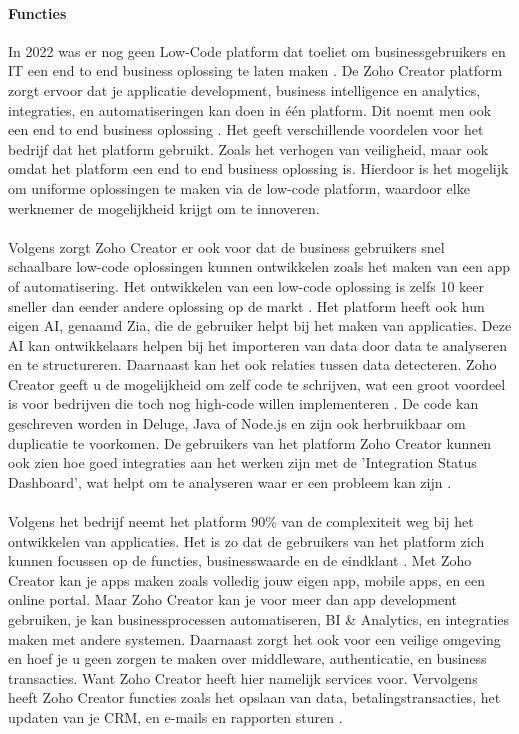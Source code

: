 \paragraph{Functies}
In 2022 was er nog geen Low-Code platform dat toeliet om businessgebruikers en IT een end to end business oplossing te laten maken \autocite{Computer2022}.
De Zoho Creator platform zorgt ervoor dat je applicatie development, business intelligence en analytics, integraties, en automatiseringen kan doen in één platform. Dit noemt men ook een end to end business oplossing \autocite{Computer2022}.
Het geeft verschillende voordelen voor het bedrijf dat het platform gebruikt. Zoals het verhogen van veiligheid, maar ook omdat het platform een end to end business oplossing is. Hierdoor is het mogelijk om uniforme oplossingen te maken via de low-code platform,
waardoor elke werknemer de mogelijkheid krijgt om te innoveren.\\\\ Volgens \textcite{Computer2022} zorgt Zoho Creator er ook voor dat de business gebruikers snel schaalbare low-code oplossingen kunnen ontwikkelen zoals het maken van een app of automatisering.
Het ontwikkelen van een low-code oplossing is zelfs 10 keer sneller dan eender andere oplossing op de markt \autocite{Computer2022}. Het platform heeft ook hun eigen AI, genaamd Zia, die de gebruiker helpt bij het maken van applicaties. Deze AI
kan ontwikkelaars helpen bij het importeren van data door data te analyseren en te structureren. Daarnaast kan het ook relaties tussen data detecteren. 
Zoho Creator geeft u de mogelijkheid om zelf code te schrijven, wat een groot voordeel is voor bedrijven die toch nog high-code willen implementeren \autocite{Computer2022}. 
De code kan geschreven worden in Deluge, Java of Node.js en zijn ook herbruikbaar om duplicatie te voorkomen.
De gebruikers van het platform Zoho Creator kunnen ook zien hoe goed integraties aan het werken zijn met de 'Integration Status Dashboard', wat helpt om te analyseren waar er een probleem kan zijn \autocite{Computer2022}.
\\ 
\\
Volgens het bedrijf \textcite{ZohoCorporation2024b} neemt het platform 90\% van de complexiteit weg bij het ontwikkelen van applicaties. Het is zo dat de gebruikers van het platform
zich kunnen focussen op de functies, businesswaarde en de eindklant \autocite{ZohoCorporation2024b}.  Met Zoho Creator kan je apps maken zoals volledig jouw eigen app, mobile apps, en een online portal.
Maar Zoho Creator kan je voor meer dan app development gebruiken, je kan businessprocessen automatiseren, BI \& Analytics, en integraties maken met andere systemen. Daarnaast zorgt het ook voor een veilige omgeving en hoef je u geen zorgen 
te maken over middleware, authenticatie, en business transacties. Want Zoho Creator heeft hier namelijk services voor. Vervolgens heeft Zoho Creator functies zoals het opslaan van data,
betalingstransacties, het updaten van je CRM, en e-mails en rapporten sturen \autocite{ZohoCorporation2024b}.

